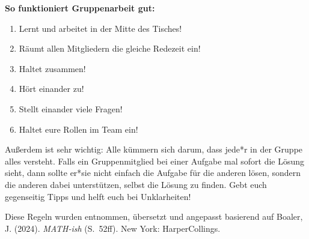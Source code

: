 \documentclass{../cssheet}
\begin{document}
\newpage

\textbf{So funktioniert Gruppenarbeit gut:} 

\begin{enumerate}
\item Lernt und arbeitet in der Mitte des Tisches!
\item Räumt allen Mitgliedern die gleiche Redezeit ein!
\item Haltet zusammen!
\item Hört einander zu!
\item Stellt einander viele Fragen!
\item Haltet eure Rollen im Team ein!
\end{enumerate}

Außerdem ist sehr wichtig: Alle kümmern sich darum, dass jede*r in der Gruppe alles versteht. Falls ein Gruppenmitglied bei einer Aufgabe mal sofort die Lösung sieht, dann sollte er*sie nicht einfach die Aufgabe für die anderen lösen, sondern die anderen dabei unterstützen, selbst die Lösung zu finden. Gebt euch gegenseitig Tipps und helft euch bei Unklarheiten!

\vspace*{10mm}
Diese Regeln wurden entnommen, übersetzt und angepasst basierend auf Boaler, J. (2024). \emph{MATH-ish} (S.~52ff). New York: HarperCollings. 

\vspace*{10mm}

\printlicense

\printsocials




\end{document}
